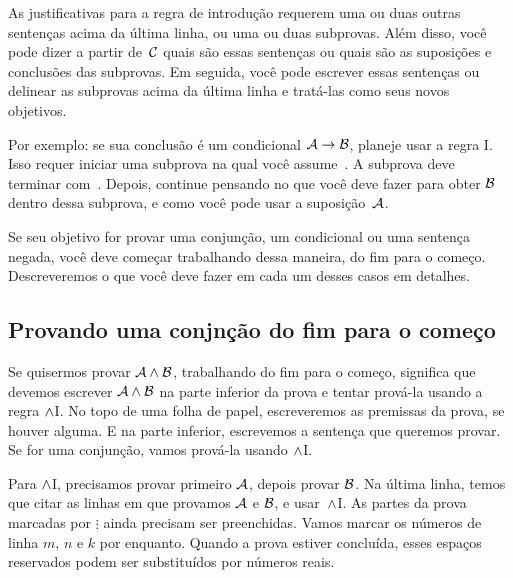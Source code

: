  As justificativas para a regra de introdu\c c\~ao requerem uma ou duas outras senten\c cas acima da \'ultima linha, ou uma ou duas subprovas. Al\'em disso, voc\^e pode dizer a partir de~$\mathcal{C}$ quais s\~ao essas senten\c cas ou quais s\~ao as suposi\c c\~oes e conclus\~oes das subprovas. Em seguida, voc\^e pode escrever essas senten\c cas ou delinear as subprovas acima da \'ultima linha e trat\'a-las como seus novos objetivos.

 Por exemplo: se sua conclus\~ao \'e um condicional $\mathcal{A}\rightarrow\mathcal{B}$,  planeje usar a regra {\eif}I.  Isso requer iniciar uma subprova na qual voc\^e assume~. A subprova deve terminar com~. Depois, continue pensando no que voc\^e deve fazer para obter $\mathcal{B}$ dentro dessa subprova,  e como voc\^e pode usar a suposi\c c\~ao~$\mathcal{A}$.

 Se seu objetivo for provar uma conjun\c c\~ao, um condicional ou uma senten\c ca negada, voc\^e deve come\c car trabalhando dessa maneira, do fim para o come\c co. Descreveremos o que voc\^e deve fazer em cada um desses casos em detalhes.
 
\subsection*{Provando uma conjn\c c\~ao do fim para o come\c co}

Se quisermos provar  $\mathcal{A} \wedge \mathcal{B}$,  trabalhando do fim para o come\c co, significa que devemos escrever $\mathcal{A} \wedge \mathcal{B}$ na parte inferior da prova e tentar prov\'a-la usando a regra $\wedge$I. No topo de uma folha de papel, escreveremos as premissas  da prova, se houver alguma. E  na parte inferior, escrevemos a senten\c ca que queremos provar. Se for uma conjun\c c\~ao, vamos prov\'a-la usando $\wedge$I.
  \begin{fitchproof}
	\ellipsesline 
\ellipsesline
    \ellipsesline 
  \end{fitchproof}
Para $\wedge$I, precisamos provar primeiro $\mathcal{A}$, depois provar $\mathcal{B}$. Na \'ultima linha, temos que citar as linhas em que provamos $\mathcal{A}$ e  $\mathcal{B}$, e usar~$\wedge$I. As partes da prova marcadas por $\vdots$ ainda precisam ser preenchidas. Vamos marcar os n\'umeros de linha $m$, $n$ e $k$ por enquanto. Quando a prova estiver conclu\'ida, esses espa\c cos reservados podem ser substitu\'idos por n\'umeros reais.
 


